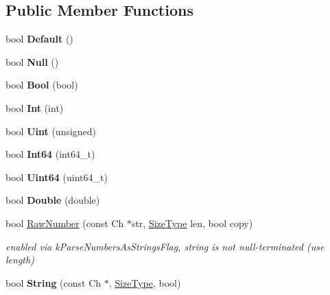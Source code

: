 \subsection*{Public Member Functions}
\begin{DoxyCompactItemize}
\item 
bool {\bfseries Default} ()\hypertarget{a00045_a836437f6ccc37f08ff933f009b18a78c}{}\label{a00045_a836437f6ccc37f08ff933f009b18a78c}

\item 
bool {\bfseries Null} ()\hypertarget{a00045_ae2ebbde4628bf3659ddc5d18520935f5}{}\label{a00045_ae2ebbde4628bf3659ddc5d18520935f5}

\item 
bool {\bfseries Bool} (bool)\hypertarget{a00045_aa1c3ce42dbb856b3349792dc9d963587}{}\label{a00045_aa1c3ce42dbb856b3349792dc9d963587}

\item 
bool {\bfseries Int} (int)\hypertarget{a00045_a85e813aaf7189a2f87bd53953324fafc}{}\label{a00045_a85e813aaf7189a2f87bd53953324fafc}

\item 
bool {\bfseries Uint} (unsigned)\hypertarget{a00045_a0e683306cbb7b4e350a35c18c5246f2a}{}\label{a00045_a0e683306cbb7b4e350a35c18c5246f2a}

\item 
bool {\bfseries Int64} (int64\+\_\+t)\hypertarget{a00045_a04011733ea584739c97ad5c6afa15a35}{}\label{a00045_a04011733ea584739c97ad5c6afa15a35}

\item 
bool {\bfseries Uint64} (uint64\+\_\+t)\hypertarget{a00045_a351aa3cd81856a487c21022e9cc64d2b}{}\label{a00045_a351aa3cd81856a487c21022e9cc64d2b}

\item 
bool {\bfseries Double} (double)\hypertarget{a00045_a8156ea6ae5b8cd23a8b700e92a8af1eb}{}\label{a00045_a8156ea6ae5b8cd23a8b700e92a8af1eb}

\item 
bool \hyperlink{a00045_a9ed0d83d5e6c8f5e4b32ca3735ff0bb7}{Raw\+Number} (const Ch $\ast$str, \hyperlink{a00677_a5ed6e6e67250fadbd041127e6386dcb5}{Size\+Type} len, bool copy)\hypertarget{a00045_a9ed0d83d5e6c8f5e4b32ca3735ff0bb7}{}\label{a00045_a9ed0d83d5e6c8f5e4b32ca3735ff0bb7}

\begin{DoxyCompactList}\small\item\em enabled via k\+Parse\+Numbers\+As\+Strings\+Flag, string is not null-\/terminated (use length) \end{DoxyCompactList}\item 
bool {\bfseries String} (const Ch $\ast$, \hyperlink{a00677_a5ed6e6e67250fadbd041127e6386dcb5}{Size\+Type}, bool)\hypertarget{a00045_a3ac69e6326d0aeef7b1f2619742bbe00}{}\label{a00045_a3ac69e6326d0aeef7b1f2619742bbe00}


\end{DoxyCompactItemize}

